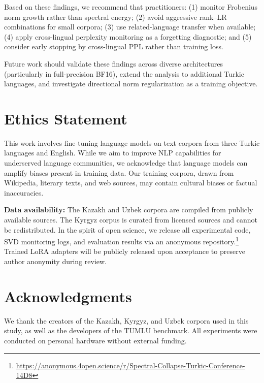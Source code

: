 \documentclass[11pt]{article}
\begin{document}
Based on these findings, we recommend that practitioners: (1) monitor Frobenius norm growth rather than spectral energy; (2) avoid aggressive rank--LR combinations for small corpora; (3) use related-language transfer when available; (4) apply cross-lingual perplexity monitoring as a forgetting diagnostic; and (5) consider early stopping by cross-lingual PPL rather than training loss.

Future work should validate these findings across diverse architectures (particularly in full-precision BF16), extend the analysis to additional Turkic languages, and investigate directional norm regularization as a training objective.

\section*{Ethics Statement}

This work involves fine-tuning language models on text corpora from three Turkic languages and English. While we aim to improve NLP capabilities for underserved language communities, we acknowledge that language models can amplify biases present in training data. Our training corpora, drawn from Wikipedia, literary texts, and web sources, may contain cultural biases or factual inaccuracies.

\textbf{Data availability:} The Kazakh and Uzbek corpora are compiled from publicly available sources. The Kyrgyz corpus is curated from licensed sources and cannot be redistributed. In the spirit of open science, we release all experimental code, SVD monitoring logs, and evaluation results via an anonymous repository.\footnote{\url{https://anonymous.4open.science/r/Spectral-Collapse-Turkic-Conference-14D8}} Trained LoRA adapters will be publicly released upon acceptance to preserve author anonymity during review.

\section*{Acknowledgments}

We thank the creators of the Kazakh, Kyrgyz, and Uzbek corpora used in this study, as well as the developers of the TUMLU benchmark. All experiments were conducted on personal hardware without external funding.
\end{document}
